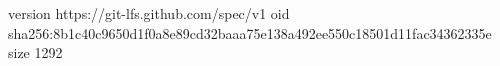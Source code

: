 version https://git-lfs.github.com/spec/v1
oid sha256:8b1c40c9650d1f0a8e89cd32baaa75e138a492ee550c18501d11fac34362335e
size 1292
